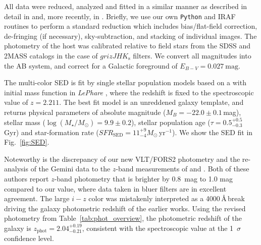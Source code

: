 \documentclass{aa}    %
\begin{document}
All data were reduced, analyzed and fitted in a similar manner as described in
detail in \citet{Kruhler2011a} and, more recently, in \citet{Schulze2016}.
Briefly, we use our own \texttt{Python} and IRAF routines to perform a standard
reduction which includes bias/flat-field correction, de-fringing (if necessary),
sky-subtraction, and stacking of individual images. The photometry of the host
was calibrated relative to field stars from the SDSS and 2MASS catalogs in the
case of $grizJHK_{\mathrm{s}}$ filters.
We convert all magnitudes into the AB system, and correct for a Galactic 
foreground of $E_{B-V}=0.027~\mathrm{mag}$.

The multi-color SED is fit by \citet{Bruzual2003} single stellar population
models based on a \citet{Chabrier2003} with initial mass function in
\emph{LePhare} \citep{Ilbert2006}, where the redshift is fixed to the
spectroscopic value of $z=2.211$. The best fit model is an unreddened galaxy
template, and returns physical parameters of absolute magnitude
($M_B=-22.0\pm0.1$\,mag), stellar mass ($\log(M_{\star}/M_\odot) = 9.9\pm0.2$),
stellar population age ($\tau = 0.5_{-0.3}^{+0.5}$ Gyr) and star-formation rate
($SFR_{\mathrm{SED}}=11_{-4}^{+9} M_\odot\,\mathrm{yr}^{-1}$). We show the SED
fit in Fig.~\ref{fig:SED}.

Noteworthy is the discrepancy of our new VLT/FORS2 photometry and the
re-analysis of the Gemini data to the $z$-band measurements of
\citet{Margutti2012} and \citet{Sakamoto2013}. Both of these authors report
$z$-band photometry that is brighter by 0.8~mag to 1.0 mag compared to our
value, where data taken in bluer filters are in excellent agreement. The large
$i-z$ color was mistakenly interpreted as a 4000\,\AA\,break driving the galaxy
photometric redshift of the earlier works. Using the revised photometry from
Table~\ref{tab:phot_overview}, the photometric redshift of the galaxy is
$z_{\mathrm{phot}}=2.04_{-0.21}^{+0.19}$, consistent with the spectroscopic
value at the 1~$\sigma$ confidence level.

\end{document}
